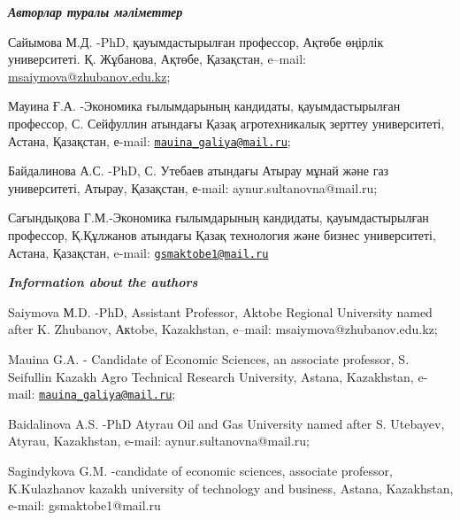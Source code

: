 \begin{authorinfo}

  \hspace{1em}\emph{{\bfseries Авторлар туралы мәліметтер}}

Сайымова М.Д. -PhD, қауымдастырылған профессор, Ақтөбе өңірлік
университеті. Қ. Жұбанова, Ақтөбе, Қазақстан, e--mail:
\href{mailto:77mika-07@mail.ru}{msaiymova@zhubanov.edu.kz};

Мауина Ғ.А. -Экономика ғылымдарының кандидаты, қауымдастырылған
профессор, С. Сейфуллин атындағы Қазақ агротехникалық зерттеу университеті, Астана, Қазақстан, е-mail:
\href{mailto:mauina_galiya@mail.ru}{\nolinkurl{mauina\_galiya@mail.ru}};

Байдалинова А.С. -PhD, С. Утебаев атындағы Атырау мұнай және газ
университеті, Атырау, Қазақстан, \linebreak е-mail: aynur.sultanovna@mail.ru;

Сағындықова Г.М.-Экономика ғылымдарының кандидаты, қауымдастырылған
профессор, Қ.Құлжанов атындағы Қазақ технология және бизнес
университеті, Астана, Қазақстан, e-mail:
\href{mailto:gsmaktobe1@mail.ru}{\nolinkurl{gsmaktobe1@mail.ru}}

\hspace{1em}\emph{{\bfseries Information about the authors}}

Saiymova М.D. -PhD, Assistant Professor, Aktobe Regional University
named after K. Zhubanov, Акtobe, Kazakhstan, e--mail:
msaiymova@zhubanov.edu.kz;

Mauina G.A. - Candidate of Economic Sciences, an associate professor, S.
Seifullin Kazakh Agro Technical Research University, Astana, Kazakhstan,
e-mail:
\href{mailto:mauina_galiya@mail.ru}{\nolinkurl{mauina\_galiya@mail.ru}};

Baidalinova A.S. -PhD Atyrau Oil and Gas University named after S.
Utebayev, Atyrau, Kazakhstan, \linebreak  e-mail: aynur.sultanovna@mail.ru;

Sagindykova G.M. -candidate of economic sciences, associate professor,
K.Kulazhanov kazakh university of technology and business, Astana,
Kazakhstan, e-mail: gsmaktobe1@mail.ru

\end{authorinfo}
